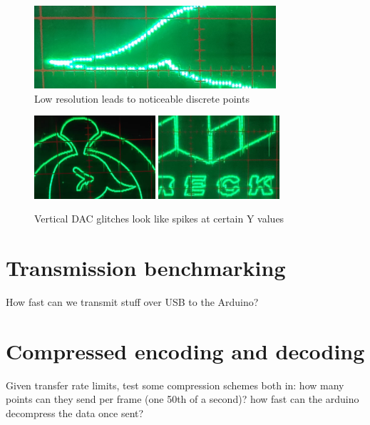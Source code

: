 \documentclass[12pt]{article}
\begin{document}
\begin{figure}
\centering
\includegraphics[width=0.8\textwidth]{images/low-resolution.png}\quad
\caption{Low resolution leads to noticeable discrete points}
\label{fig:low-resolution}
\end{figure}

\begin{figure}
\centering
\includegraphics[width=0.4\textwidth]{images/vertical-dac-glitches1.png}\quad
\includegraphics[width=0.4\textwidth]{images/vertical-dac-glitches2.png}
\caption{Vertical DAC glitches look like spikes at certain Y values}
\label{fig:vertical-dac-glitches}
\end{figure}


\section{Transmission benchmarking}

How fast can we transmit stuff over USB to the Arduino?

\section{Compressed encoding and decoding}

Given transfer rate limits, test some compression schemes both in: how many points can they send per frame (one 50th of a second)? how fast can the arduino decompress the data once sent?
\end{document}
